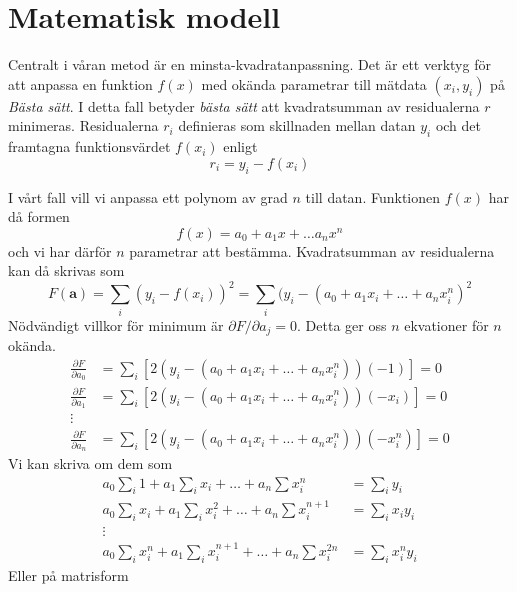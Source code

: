 \section{Matematisk modell}
\label{sec:modell}

Centralt i våran metod är en minsta-kvadratanpassning. Det är ett verktyg för att anpassa en funktion $f(x)$ med okända parametrar till mätdata $(x_i, y_i)$ på \emph{Bästa sätt}. I detta fall betyder \emph{bästa sätt} att kvadratsumman av residualerna $r$ minimeras. Residualerna $r_i$ definieras som skillnaden mellan datan $y_i$ och det framtagna funktionsvärdet $f(x_i)$ enligt
\begin{equation}
r_i = y_i - f(x_i)
\end{equation} 

I vårt fall vill vi anpassa ett polynom av grad $n$ till datan. Funktionen $f(x)$ har då formen
\begin{equation}
f(x) = a_0 + a_1x + \dots a_n x^n
\end{equation}
och vi har därför $n$ parametrar att bestämma. Kvadratsumman av residualerna kan då skrivas som
\begin{equation}
F(\mathbf{a}) = \sum_{i} (y_i - f(x_i))^2 = \sum_i (y_i - (a_0 + a_1x_i + \dots + a_n x_i^n)^2
\end{equation}
Nödvändigt villkor för minimum är $\partial F/\partial a_j = 0$. Detta ger oss $n$ ekvationer för $n$ okända.
\begin{align}
    \frac{\partial F}{\partial a_0} &= \sum_i \left[ 2(y_i - (a_0 + a_1x_i + \dots + a_n x_i^n))(-1) \right] = 0 \\
    \frac{\partial F}{\partial a_1} &= \sum_i \left[ 2(y_i - (a_0 + a_1x_i + \dots + a_n x_i^n))(-x_i) \right] = 0 \\
    \vdots \\
    \frac{\partial F}{\partial a_n} &= \sum_i \left[ 2(y_i - (a_0 + a_1x_i + \dots + a_n x_i^n))(-x_i^n) \right] = 0
\end{align}
Vi kan skriva om dem som
\begin{align}
a_0 \sum_i 1 + a_1 \sum_i x_i + \dots + a_n \sum x_i^n &= \sum_i y_i \\
a_0 \sum_i x_i + a_1 \sum_i x_i^2 + \dots + a_n \sum x_i^{n+1} &= \sum_i x_i y_i \\
\vdots \\
a_0 \sum_i x_i^n + a_1 \sum_i x_i^{n+1} + \dots + a_n \sum x_i^{2n} &= \sum_i x_i^n y_i
\end{align}
Eller på matrisform
